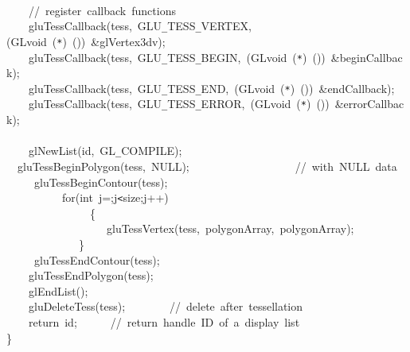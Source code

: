 {\jttstylea \\
\jttstylea ~~~~\jttstyled //~register~callback~functions\\
\jttstylea ~~~~\jttstylek gluTessCallback\jttstylei (\jttstylek tess,~GLU\verb#_#TESS\verb#_#VERTEX,\jttstylei (\jttstylek GLvoid~\jttstylei (\jttstylek \verb#*#\jttstylei )~())~\jttstylek \&glVertex3dv\jttstylei )\jttstylek ;\\
\jttstylea ~~~~\jttstylek gluTessCallback\jttstylei (\jttstylek tess,~GLU\verb#_#TESS\verb#_#BEGIN,~\jttstylei (\jttstylek GLvoid~\jttstylei (\jttstylek \verb#*#\jttstylei )~())~\jttstylek \&beginCallback\jttstylei )\jttstylek ;\\
\jttstylea ~~~~\jttstylek gluTessCallback\jttstylei (\jttstylek tess,~GLU\verb#_#TESS\verb#_#END,~\jttstylei (\jttstylek GLvoid~\jttstylei (\jttstylek \verb#*#\jttstylei )~())~\jttstylek \&endCallback\jttstylei )\jttstylek ;\\
\jttstylea ~~~~\jttstylek gluTessCallback\jttstylei (\jttstylek tess,~GLU\verb#_#TESS\verb#_#ERROR,~\jttstylei (\jttstylek GLvoid~\jttstylei (\jttstylek \verb#*#\jttstylei )~())~\jttstylek \&errorCallback\jttstylei )\jttstylek ;\\
\jttstylea \\
\jttstylea ~~~~\jttstylek glNewList\jttstylei (\jttstylek id,~GL\verb#_#COMPILE\jttstylei )\jttstylek ;\\
\jttstylea ~~\jttstylek gluTessBeginPolygon\jttstylei (\jttstylek tess,~NULL\jttstylei )\jttstylek ;~~~~~~~~~~~~~~~~~~~\jttstyled //~with~NULL~data\\
\jttstylea ~~~~~\jttstylek gluTessBeginContour\jttstylei (\jttstylek tess\jttstylei )\jttstylek ;\\
\jttstylea ~~~~~~~~~~\jttstylee for\jttstylei (\jttstylej int~\jttstylek j=\jttstylek ;j\verb#<#size;j++\jttstylei )\\
\jttstylea ~~~~~~~~~~~~~~~\jttstylei \{\\
\jttstylea ~~~~~~~~~~~~~~~~~~\jttstylek gluTessVertex\jttstylei (\jttstylek tess,~polygonArray\jttstylek ,~polygonArray)\jttstylek ;\\
\jttstylea ~~~~~~~~~~~~~\jttstylei \}\\
\jttstylea ~~~~~\jttstylek gluTessEndContour\jttstylei (\jttstylek tess\jttstylei )\jttstylek ;\\
\jttstylea ~~~~\jttstylek gluTessEndPolygon\jttstylei (\jttstylek tess\jttstylei )\jttstylek ;\\
\jttstylea ~~~~\jttstylek glEndList\jttstylei ()\jttstylek ;\\
\jttstylea ~~~~\jttstylek gluDeleteTess\jttstylei (\jttstylek tess\jttstylei )\jttstylek ;~~~~~~~~\jttstyled //~delete~after~tessellation\\
\jttstylea ~~~~\jttstylee return~\jttstylek id;~~~~~~\jttstyled //~return~handle~ID~of~a~display~list\\
\jttstylei \}\\

}